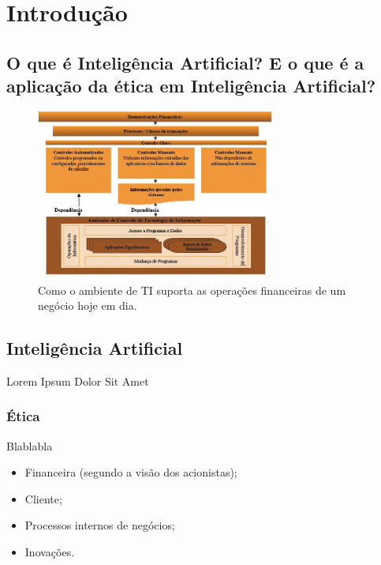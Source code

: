 \chapter{Introdução}

\section{O que é Inteligência Artificial? E o que é a aplicação da ética em Inteligência Artificial?}

	
\begin{figure}
            \begin{center}
                \includegraphics[width=0.7\textwidth]{Img1}
            \end{center}
            \caption{Como o ambiente de TI suporta as operações financeiras de um negócio hoje em dia.}
            \label{fig:Img1}
\end{figure}

\section{Inteligência Artificial}

    Lorem Ipsum Dolor Sit Amet\cite{SOX}
	
\subsection{Ética}

	Blablabla

\begin{itemize}
\item    Financeira (segundo a visão dos acionistas);
\item	 Cliente;
\item	 Processos internos de negócios;
\item	 Inovações.
\end{itemize}

